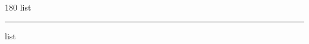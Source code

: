 
\begin{frame}
\begin{center}
\begin{turn}{180}
{\fontsize{2.5cm}{1em}\selectfont list}
\end{turn}
\vspace{1em}\par  
\hrule
\vspace{1em}\par  
{\fontsize{2.5cm}{1em}\selectfont list}
\end{center}
\end{frame}
